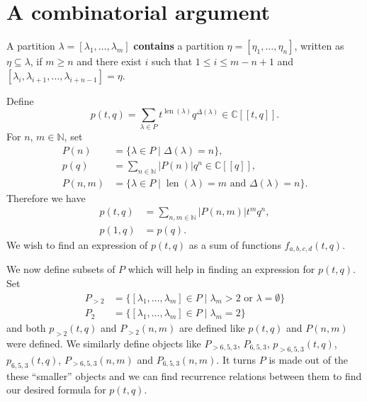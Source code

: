 \documentclass[12pt,a4paper]{article}
\DeclareMathOperator{\len}{len}
\begin{document}
\section{A combinatorial argument}
\label{sec:comb-argum}

A partition $\lambda=[\lambda_1,\dots, \lambda_m]$ \textbf{contains} a partition $\eta=[\eta_1,\dots, \eta_n]$, written as $\eta\subseteq \lambda$, if $m\ge n$ and there exist $i$ such that $1\le i\le m-n+1$ and $[\lambda_i,\lambda_{i+1},\dots, \lambda_{i+n-1}]=\eta$.

Define
\begin{equation*}
  p(t,q)=\sum_{\lambda\in P}t^{\len(\lambda)}q^{\Delta(\lambda)}\in \mathbb{C}[[t,q]].
\end{equation*}
For $n$, $m\in \mathbb{N}$, set
\begin{align*}
  P(n)&=\{\lambda\in P\mid \Delta(\lambda)=n\}, \\
  p(q)&=\sum_{n\in \mathbb{N}}|P(n)|q^n\in \mathbb{C}[[q]], \\
  P(n,m)&=\{\lambda\in P\mid \len(\lambda)=m \text{ and }\Delta(\lambda)=n\}.
\end{align*}
Therefore we have
\begin{align*}
  p(t,q)&=\sum_{n,m\in \mathbb{N}}|P(n,m)|t^mq^n, \\
  p(1,q)&=p(q).
\end{align*}
We wish to find an expression of $p(t,q)$ as a sum of functions $f_{a,b,c,d}(t,q)$.

We now define subsets of $P$ which will help in finding an expression for $p(t,q)$.
Set
\begin{align*}
  P_{>2}&=\{[\lambda_1,\dots, \lambda_m]\in P\mid \lambda_m>2 \text{ or } \lambda=\emptyset\} \\
  P_{2}&=\{[\lambda_1,\dots, \lambda_m]\in P\mid \lambda_m=2\}
\end{align*}
and both $p_{>2}(t,q)$ and $P_{>2}(n,m)$ are defined like $p(t,q)$ and $P(n,m)$ were defined.
We similarly define objects like $P_{>6,5,3}$, $P_{6,5,3}$, $p_{>6,5,3}(t,q)$, $p_{6,5,3}(t,q)$, $P_{>6,5,3}(n,m)$ and $P_{6,5,3}(n,m)$.
It turns $P$ is made out of the these ``smaller'' objects and we can find recurrence relations between them to find our desired formula for $p(t,q)$.
\end{document}
